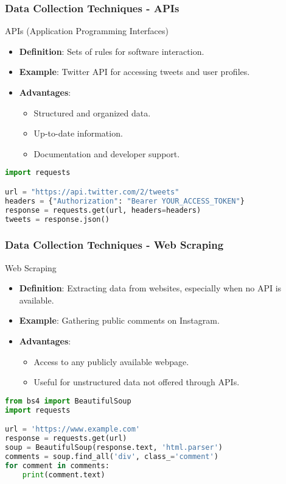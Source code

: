 \documentclass{beamer}
\begin{document}
\begin{frame}[fragile]
    \frametitle{Data Collection Techniques - APIs}
    \begin{block}{APIs (Application Programming Interfaces)}
        \begin{itemize}
            \item \textbf{Definition}: Sets of rules for software interaction.
            \item \textbf{Example}: Twitter API for accessing tweets and user profiles.
            \item \textbf{Advantages}:
            \begin{itemize}
                \item Structured and organized data.
                \item Up-to-date information.
                \item Documentation and developer support.
            \end{itemize}
        \end{itemize}
    \end{block}
    
    \begin{lstlisting}[language=Python, caption=Basic API Usage Example]
import requests

url = "https://api.twitter.com/2/tweets"
headers = {"Authorization": "Bearer YOUR_ACCESS_TOKEN"}
response = requests.get(url, headers=headers)
tweets = response.json()
    \end{lstlisting}
\end{frame}

\begin{frame}[fragile]
    \frametitle{Data Collection Techniques - Web Scraping}
    \begin{block}{Web Scraping}
        \begin{itemize}
            \item \textbf{Definition}: Extracting data from websites, especially when no API is available.
            \item \textbf{Example}: Gathering public comments on Instagram.
            \item \textbf{Advantages}:
            \begin{itemize}
                \item Access to any publicly available webpage.
                \item Useful for unstructured data not offered through APIs.
            \end{itemize}
        \end{itemize}
    \end{block}
    
    \begin{lstlisting}[language=Python, caption=Basic Web Scraping Example]
from bs4 import BeautifulSoup
import requests

url = 'https://www.example.com'
response = requests.get(url)
soup = BeautifulSoup(response.text, 'html.parser')
comments = soup.find_all('div', class_='comment')
for comment in comments:
    print(comment.text)
    \end{lstlisting}
\end{frame}
\end{document}
